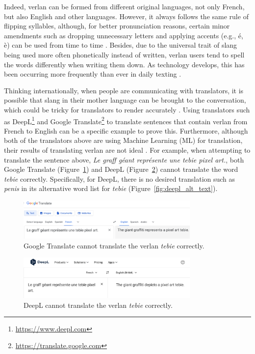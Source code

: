 \documentclass[12pt]{article}
\begin{document}
Indeed, verlan can be formed from different original languages, not only French, but also English and other languages. However, it always follows the same rule of flipping syllables, although, for better pronunciation reasons, certain minor amendments such as dropping unnecessary letters and applying accents (e.g., é, è) can be used from time to time \cite{rajabov2025}. Besides, due to the universal trait of slang being used more often phonetically instead of written, verlan users tend to spell the words differently when writing them down. As technology develops, this has been occurring more frequently than ever in daily texting \cite{rua2005}.

Thinking internationally, when people are communicating with translators, it is possible that slang in their mother language can be brought to the conversation, which could be tricky for translators to render accurately \cite{hajiyeva2025}. Using translators such as DeepL\footnote{\url{https://www.deepl.com}} and Google Translate\footnote{\url{https://translate.google.com}} to translate sentences that contain verlan from French to English can be a specific example to prove this. Furthermore, although both of the translators above are using Machine Learning (ML) for translation, their results of translating verlan are not ideal \cite{deepl2020, wu2016}. For example, when attempting to translate the sentence above, \textit{Le graff géant représente une tebie pixel art.}, both Google Translate (Figure~\ref{fig:google_verlan}) and DeepL (Figure~\ref{fig:deepl_verlan}) cannot translate the word \textit{tebie} correctly. Specifically, for DeepL, there is no desired translation such as \textit{penis} in its alternative word list for \textit{tebie} (Figure~\ref{fig:deepl_alt_text}).

\begin{figure}[H]
\centering
\includegraphics[width=0.8\textwidth]{figures/google_verlan.png}
\caption{\label{fig:google_verlan}Google Translate cannot translate the verlan \textit{tebie} correctly.}
\end{figure}

\begin{figure}[H]
\centering
\includegraphics[width=0.8\textwidth]{figures/deepl_verlan.png}
\caption{\label{fig:deepl_verlan}DeepL cannot translate the verlan \textit{tebie} correctly.}
\end{figure}
\end{document}
